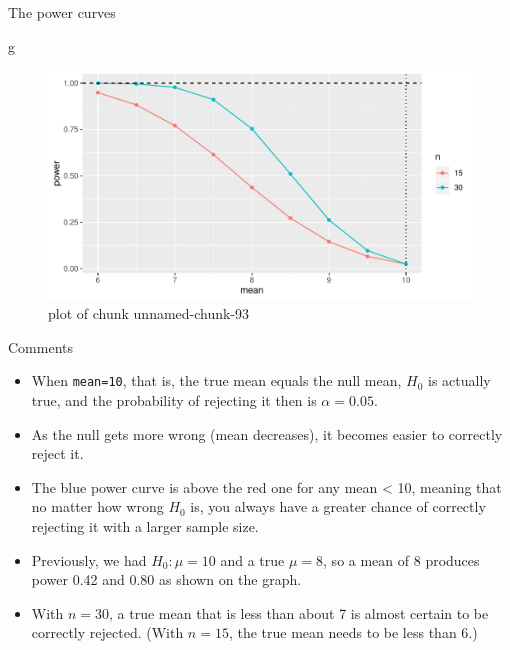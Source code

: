 \documentclass[ignorenonframetext,]{beamer}
\newenvironment{Shaded}{\begin{snugshade}}{\end{snugshade}}
\newcommand{\NormalTok}[1]{#1}
\providecommand{\tightlist}{%
  \setlength{\itemsep}{0pt}\setlength{\parskip}{0pt}}
\begin{document}
\begin{frame}[fragile]{The power curves}
\protect\hypertarget{the-power-curves}{}

\begin{Shaded}
\begin{Highlighting}[]
\NormalTok{g}
\end{Highlighting}
\end{Shaded}

\begin{figure}
\centering
\includegraphics{figure/unnamed-chunk-93-1.pdf}
\caption{plot of chunk unnamed-chunk-93}
\end{figure}

\end{frame}

\begin{frame}[fragile]{Comments}
\protect\hypertarget{comments-3}{}

\begin{itemize}
\tightlist
\item
  When \texttt{mean=10}, that is, the true mean equals the null mean,
  \(H_0\) is actually true, and the probability of rejecting it then is
  \(\alpha = 0.05\).
\item
  As the null gets more wrong (mean decreases), it becomes easier to
  correctly reject it.
\item
  The blue power curve is above the red one for any mean \textless{} 10,
  meaning that no matter how wrong \(H_0\) is, you always have a greater
  chance of correctly rejecting it with a larger sample size.
\item
  Previously, we had \(H_0 : \mu = 10\) and a true \(\mu = 8\), so a
  mean of 8 produces power 0.42 and 0.80 as shown on the graph.
\item
  With \(n = 30\), a true mean that is less than about 7 is almost
  certain to be correctly rejected. (With \(n = 15\), the true mean
  needs to be less than 6.)
\end{itemize}

\end{frame}
\end{document}
